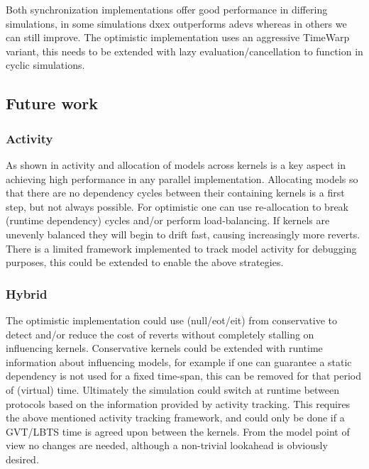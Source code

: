 Both synchronization implementations offer good performance in differing simulations, in some simulations dxex outperforms adevs whereas in others we can still improve. 
The optimistic implementation uses an aggressive TimeWarp variant, this needs to be extended with lazy evaluation/cancellation to function in cyclic simulations. 
\subsection{Future work}
\subsubsection{Activity}
As shown in \cite{PythonPDEVS_ACTIMS} activity and allocation of models across kernels is a key aspect in achieving high performance in any parallel implementation. Allocating models so that there are no dependency cycles between their containing kernels is a first step, but not always possible. For optimistic one can use re-allocation to break (runtime dependency) cycles and/or perform load-balancing. If kernels are unevenly balanced they will begin to drift fast, causing increasingly more reverts. There is a limited framework implemented to track model activity for debugging purposes, this could be extended to enable the above strategies.
\subsubsection{Hybrid}
The optimistic implementation could use (null/eot/eit) from conservative to detect and/or reduce the cost of reverts without completely stalling on influencing kernels.
Conservative kernels could be extended with runtime information about influencing models, for example if one can guarantee a static dependency is not used for a fixed time-span, this can be removed for that period of (virtual) time. 
Ultimately the simulation could switch at runtime between protocols based on the information provided by activity tracking. This requires the above mentioned activity tracking framework, and could only be done if a GVT/LBTS time is agreed upon between the kernels. From the model point of view no changes are needed, although a non-trivial lookahead is obviously desired. 
